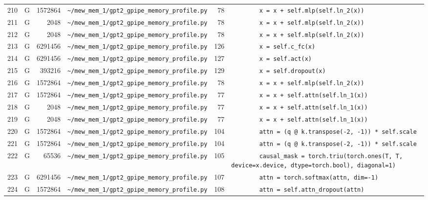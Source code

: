 \documentclass{article}
\begin{document}
\begin{longtable}{r l r p{6.5cm} r p{7.0cm}}
210 & G & 1572864 & \lstinline|~/mew_mem_1/gpt2_gpipe_memory_profile.py| & 78 & \lstinline|        x = x + self.mlp(self.ln_2(x))| \\
211 & G & 2048 & \lstinline|~/mew_mem_1/gpt2_gpipe_memory_profile.py| & 78 & \lstinline|        x = x + self.mlp(self.ln_2(x))| \\
212 & G & 2048 & \lstinline|~/mew_mem_1/gpt2_gpipe_memory_profile.py| & 78 & \lstinline|        x = x + self.mlp(self.ln_2(x))| \\
213 & G & 6291456 & \lstinline|~/mew_mem_1/gpt2_gpipe_memory_profile.py| & 126 & \lstinline|        x = self.c_fc(x)| \\
214 & G & 6291456 & \lstinline|~/mew_mem_1/gpt2_gpipe_memory_profile.py| & 127 & \lstinline|        x = self.act(x)| \\
215 & G & 393216 & \lstinline|~/mew_mem_1/gpt2_gpipe_memory_profile.py| & 129 & \lstinline|        x = self.dropout(x)| \\
216 & G & 1572864 & \lstinline|~/mew_mem_1/gpt2_gpipe_memory_profile.py| & 78 & \lstinline|        x = x + self.mlp(self.ln_2(x))| \\
217 & G & 1572864 & \lstinline|~/mew_mem_1/gpt2_gpipe_memory_profile.py| & 77 & \lstinline|        x = x + self.attn(self.ln_1(x))| \\
218 & G & 2048 & \lstinline|~/mew_mem_1/gpt2_gpipe_memory_profile.py| & 77 & \lstinline|        x = x + self.attn(self.ln_1(x))| \\
219 & G & 2048 & \lstinline|~/mew_mem_1/gpt2_gpipe_memory_profile.py| & 77 & \lstinline|        x = x + self.attn(self.ln_1(x))| \\
220 & G & 1572864 & \lstinline|~/mew_mem_1/gpt2_gpipe_memory_profile.py| & 104 & \lstinline|        attn = (q @ k.transpose(-2, -1)) * self.scale| \\
221 & G & 1572864 & \lstinline|~/mew_mem_1/gpt2_gpipe_memory_profile.py| & 104 & \lstinline|        attn = (q @ k.transpose(-2, -1)) * self.scale| \\
222 & G & 65536 & \lstinline|~/mew_mem_1/gpt2_gpipe_memory_profile.py| & 105 & \lstinline|        causal_mask = torch.triu(torch.ones(T, T, device=x.device, dtype=torch.bool), diagonal=1)| \\
223 & G & 6291456 & \lstinline|~/mew_mem_1/gpt2_gpipe_memory_profile.py| & 107 & \lstinline|        attn = torch.softmax(attn, dim=-1)| \\
224 & G & 1572864 & \lstinline|~/mew_mem_1/gpt2_gpipe_memory_profile.py| & 108 & \lstinline|        attn = self.attn_dropout(attn)| \\

\end{longtable}
\end{document}
